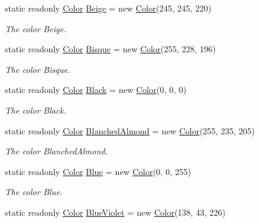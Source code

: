 \begin{DoxyCompactItemize}
static readonly \hyperlink{struct_tri_devs_1_1_tri_engine_1_1_color}{Color} \hyperlink{struct_tri_devs_1_1_tri_engine_1_1_color_a483cb936d847618fbb1daea09852d299}{Beige} = new \hyperlink{struct_tri_devs_1_1_tri_engine_1_1_color}{Color}(245, 245, 220)
\begin{DoxyCompactList}\small\item\em The color Beige. \end{DoxyCompactList}\item 
static readonly \hyperlink{struct_tri_devs_1_1_tri_engine_1_1_color}{Color} \hyperlink{struct_tri_devs_1_1_tri_engine_1_1_color_a844107e304b4737b0ab05bb300eb8ba3}{Bisque} = new \hyperlink{struct_tri_devs_1_1_tri_engine_1_1_color}{Color}(255, 228, 196)
\begin{DoxyCompactList}\small\item\em The color Bisque. \end{DoxyCompactList}\item 
static readonly \hyperlink{struct_tri_devs_1_1_tri_engine_1_1_color}{Color} \hyperlink{struct_tri_devs_1_1_tri_engine_1_1_color_a352957b410f8cc32fd4b63e6b521e230}{Black} = new \hyperlink{struct_tri_devs_1_1_tri_engine_1_1_color}{Color}(0, 0, 0)
\begin{DoxyCompactList}\small\item\em The color Black. \end{DoxyCompactList}\item 
static readonly \hyperlink{struct_tri_devs_1_1_tri_engine_1_1_color}{Color} \hyperlink{struct_tri_devs_1_1_tri_engine_1_1_color_ab54f667353fe6bd0bf9b75617457ef34}{Blanched\-Almond} = new \hyperlink{struct_tri_devs_1_1_tri_engine_1_1_color}{Color}(255, 235, 205)
\begin{DoxyCompactList}\small\item\em The color Blanched\-Almond. \end{DoxyCompactList}\item 
static readonly \hyperlink{struct_tri_devs_1_1_tri_engine_1_1_color}{Color} \hyperlink{struct_tri_devs_1_1_tri_engine_1_1_color_a1078a26e4424c6836007aa8aefde6add}{Blue} = new \hyperlink{struct_tri_devs_1_1_tri_engine_1_1_color}{Color}(0, 0, 255)
\begin{DoxyCompactList}\small\item\em The color Blue. \end{DoxyCompactList}\item 
static readonly \hyperlink{struct_tri_devs_1_1_tri_engine_1_1_color}{Color} \hyperlink{struct_tri_devs_1_1_tri_engine_1_1_color_a9a0a8b0fbff273450bb7c5fd9d6b01a6}{Blue\-Violet} = new \hyperlink{struct_tri_devs_1_1_tri_engine_1_1_color}{Color}(138, 43, 226)

\end{DoxyCompactItemize}
